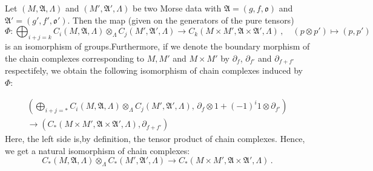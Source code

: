 \begin{remark}
			Let $(M,\mathfrak{A},\Lambda)$ and $(M',\mathfrak{A}',\Lambda)$ be two Morse data with $\mathfrak{A}=(g,f,\mathfrak{o})$ and $ \mathfrak{A}'=(g',f',\mathfrak{o}')$. Then the map (given on the generators of the pure tensors)
		\begin{equation*}
			\Phi: \bigoplus_{i+j=k}C_i(M,\mathfrak{A},\Lambda)\otimes_\Lambda C_j(M',\mathfrak{A}',\Lambda) \to C_k(M\times M',\mathfrak{A}\times \mathfrak{A}',\Lambda)\,,\quad (p\otimes p')\mapsto (p,p')
		\end{equation*}
		is an isomorphism of groups.Furthermore, if we denote the boundary morphism of the chain complexes corresponding to $M,M'$ and $M\times M'$ by $\partial_f$, $\partial_{f'}$ and $\partial_{f+f'}$ respectifely, we	
		 obtain the following isomorphism of chain complexes induced by $\Phi$:

		\begin{multline*}
    \left(\bigoplus_{i+j=*}C_i(M,\mathfrak{A},\Lambda)\otimes_\Lambda C_j(M',\mathfrak{A}',\Lambda),\,\partial_f\otimes 1 +(-1)^i1\otimes \partial_{f'} \right)\\
    \to \left(C_*(M\times M',\mathfrak{A}\times \mathfrak{A}',\Lambda),\partial_{f+f'}\right)
\end{multline*}
		Here, the left side is,by definition, the tensor product of chain complexes. Hence, we get a natural isomorphism of chain complexes:
		\begin{equation*}
			C_*(M,\mathfrak{A},\Lambda)\otimes_\Lambda C_*(M',\mathfrak{A}',\Lambda) \to C_*(M\times M',\mathfrak{A}\times \mathfrak{A}',\Lambda) \,.
		\end{equation*}
	\end{remark}

